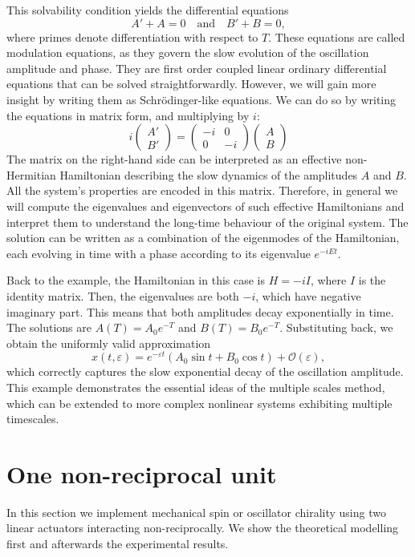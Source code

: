 \documentclass[11pt, a4paper]{article} %
\begin{document}
This solvability condition yields the differential equations
\[
A' + A = 0 \quad \text{and} \quad B' + B = 0,
\]
where primes denote differentiation with respect to $T$. 
These equations are called modulation equations, as they govern the slow evolution of the oscillation amplitude and phase. 
They are first order coupled linear ordinary differential equations that can be solved straightforwardly. 
However, we will gain more insight by writing them as Schrödinger-like equations. We can do so by writing the equations 
in matrix form, and multiplying by $i$:
\begin{equation}
    i\begin{pmatrix}
    A' \\ B'
    \end{pmatrix}
    =
    \begin{pmatrix}
    -i & 0 \\
    0 & -i
    \end{pmatrix}
    \begin{pmatrix}
    A \\ B
    \end{pmatrix}
\end{equation}
The matrix on the right-hand side can be interpreted as an effective non-Hermitian Hamiltonian describing 
the slow dynamics of the amplitudes $A$ and $B$. All the system's properties are encoded in this matrix. 
Therefore, in general we will compute the eigenvalues and eigenvectors of such effective Hamiltonians 
and interpret them to understand the long-time behaviour of the original system. The solution can be written as
a combination of the eigenmodes of the Hamiltonian, each evolving in time with a phase according to its eigenvalue $e^{-iEt}$.

Back to the example, the Hamiltonian in this case is $H=-i I$, where $ I$ is the identity matrix. Then, the 
eigenvalues are both $-i$, which have negative imaginary part. This means that both amplitudes decay exponentially in time.
The solutions are $A(T) = A_0 e^{-T}$ and $B(T) = B_0 e^{-T}$. Substituting back, we obtain the uniformly valid approximation
\[
x(t,\varepsilon) = e^{-\varepsilon t}(A_0\sin t + B_0\cos t) + \mathcal{O}(\varepsilon),
\]
which correctly captures the slow exponential decay of the oscillation amplitude. This example demonstrates the essential ideas 
of the multiple scales method, which can be extended to more complex nonlinear systems exhibiting multiple timescales.

\section{One non-reciprocal unit}
\label{sec:1unit}
In this section we implement mechanical spin or oscillator chirality using two linear actuators interacting non-reciprocally. We show the 
theoretical modelling first and afterwards the experimental results. 
\end{document}
